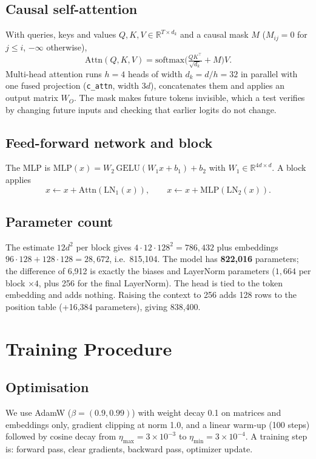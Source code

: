 \documentclass[10pt,twocolumn]{article}
\begin{document}
\subsection{Causal self-attention}
With queries, keys and values $Q,K,V\in\mathbb{R}^{T\times d_k}$ and a causal mask $M$ ($M_{ij}=0$ for $j\le i$, $-\infty$ otherwise),
\begin{equation}
\mathrm{Attn}(Q,K,V)=\mathrm{softmax}\!\Big(\tfrac{QK^{\top}}{\sqrt{d_k}}+M\Big)V .
\end{equation}
Multi-head attention runs $h=4$ heads of width $d_k=d/h=32$ in parallel with one fused projection (\texttt{c\_attn}, width $3d$), concatenates them and applies an output matrix $W_O$. The mask makes future tokens invisible, which a test verifies by changing future inputs and checking that earlier logits do not change.

\subsection{Feed-forward network and block}
The MLP is $\mathrm{MLP}(x)=W_2\,\mathrm{GELU}(W_1x+b_1)+b_2$ with $W_1\in\mathbb{R}^{4d\times d}$. A block applies
\begin{equation}
x\leftarrow x+\mathrm{Attn}(\mathrm{LN}_1(x)),\qquad x\leftarrow x+\mathrm{MLP}(\mathrm{LN}_2(x)).
\end{equation}

\subsection{Parameter count}
The estimate $12d^2$ per block gives $4\cdot12\cdot128^2=786{,}432$ plus embeddings $96\cdot128+128\cdot128=28{,}672$, i.e.\ 815,104. The model has \textbf{822,016} parameters; the difference of 6,912 is exactly the biases and LayerNorm parameters ($1{,}664$ per block $\times4$, plus 256 for the final LayerNorm). The head is tied to the token embedding and adds nothing. Raising the context to 256 adds 128 rows to the position table (+16,384 parameters), giving 838,400.

\section{Training Procedure}
\subsection{Optimisation}
We use AdamW ($\beta=(0.9,0.99)$) \cite{loshchilov2019} with weight decay 0.1 on matrices and embeddings only, gradient clipping at norm 1.0, and a linear warm-up (100 steps) followed by cosine decay from $\eta_{\max}=3\times10^{-3}$ to $\eta_{\min}=3\times10^{-4}$. A training step is: forward pass, clear gradients, backward pass, optimizer update.
\end{document}
